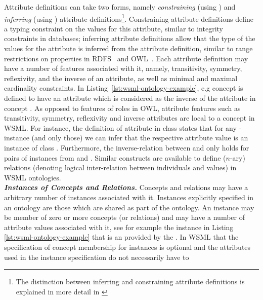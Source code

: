 Attribute definitions can take two forms, namely \emph{constraining}
(using ) and \emph{inferring} (using
) attribute definitions\footnote{The distinction
  between inferring and constraining attribute definitions is
  explained in more detail in \cite[Section
  2]{debr-etal-2005c}}. Constraining attribute definitions
define a typing constraint on the values for this attribute, similar
to integrity constraints in databases; inferring attribute
definitions allow that the type of the values for the attribute is
inferred from the attribute definition, similar to range
restrictions on properties in
RDFS~\cite{Brickley+Guha-VocaDescLang:03} and
OWL~\cite{Dean+Schreiber-OntoLangRefe:04}.  Each attribute
definition may have a number of features associated with it, namely,
transitivity, symmetry, reflexivity, and the inverse of an
attribute, as well as minimal and maximal cardinality constraints.
In Listing~\ref{lst:wsml-ontology-example}, e.g concept 
is defined to have an attribute  which is
considered as the inverse of the attribute  in concept .
As opposed to features of roles in OWL, attribute features
such as transitivity, symmetry, reflexivity and inverse attributes are local
to a concept in WSML.
For instance, the definition of attribute  in
class  states that for any -instance (and only those) we
can infer that the respective attribute value is an instance of class
. Furthermore, the inverse-relation between
 and  only holds for pairs of
instances from  and .
Similar constructs are available to define ($n$-ary) relations (denoting
logical inter-relation between individuals and values) in WSML
ontologies.
\\ {\it \bfseries Instances of Concepts and Relations.}
Concepts and relations may have a arbitrary number of
instances associated with it. Instances explicitly specified in an
ontology are those which are shared as part of the ontology. An
instance may be member of zero or more concepts (or relations) and may have a
number of attribute values associated with it, see for example the
instance  in Listing
\ref{lst:wsml-ontology-example} that is an  provided by the .
In WSML that the specification of
concept membership for instances is optional and the attributes
used in the instance specification do not necessarily have to
